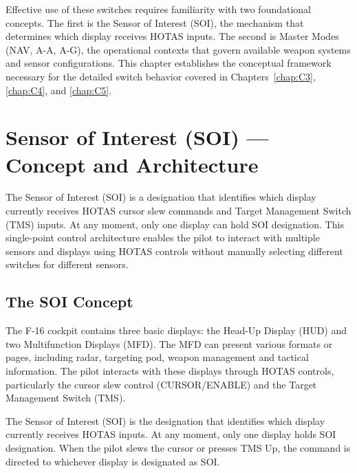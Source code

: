 \documentclass[11pt, a4paper, twoside]{report}
\begin{document}
Effective use of these switches requires familiarity with two foundational concepts. The first is the Sensor of Interest (SOI), the mechanism that determines which display receives HOTAS inputs. The second is Master Modes (NAV, A-A, A-G), the operational contexts that govern available weapon systems and sensor configurations. This chapter establishes the conceptual framework necessary for the detailed switch 
behavior covered in Chapters~\ref{chap:C3}, \ref{chap:C4}, and \ref{chap:C5}.


\section{Sensor of Interest (SOI) — Concept and Architecture}
\label{sec:C2-S1}

The Sensor of Interest (SOI) is a designation that identifies which display currently receives HOTAS cursor slew commands and Target Management Switch (TMS) inputs. At any moment, only one display can hold SOI designation. This single-point control architecture enables the pilot to interact with multiple sensors and displays using HOTAS controls without manually selecting different switches for different sensors.


\subsection{The SOI Concept}
\label{sec:C2-S1-S1}

The F-16 cockpit contains three basic displays: the Head-Up Display (HUD) and two Multifunction Displays (MFD). The MFD can present various formats or pages, including radar, targeting pod, weapon management and tactical information. The pilot interacts with these displays through HOTAS controls, particularly the cursor slew control (CURSOR/ENABLE) and the Target Management Switch (TMS).

The Sensor of Interest (SOI) is the designation that identifies which display currently receives HOTAS inputs. At any moment, only one display holds SOI designation. When the pilot slews the cursor or presses TMS Up, the command is directed to whichever display is designated as SOI.
\end{document}
